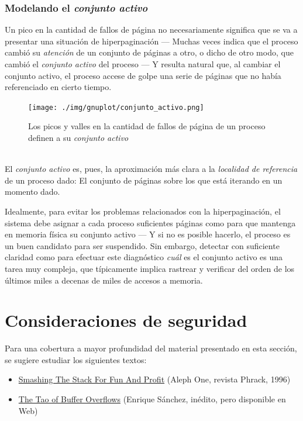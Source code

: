 \documentclass[11pt,fleqn]{book} %
\begin{document}
\subsubsection{Modelando el \emph{conjunto activo}}
\label{sec-5-5-5-1}
\label{MEM_mod_conjunto_activo}


Un pico en la cantidad de fallos de página no necesariamente
significa que se va a presentar una situación de hiperpaginación —
Muchas veces indica que el proceso cambió su \emph{atención} de un
conjunto de páginas a otro, o dicho de otro modo, que cambió el
\emph{conjunto activo} del proceso — Y resulta natural que, al cambiar el
conjunto activo, el proceso accese de golpe una serie de páginas que
no había referenciado en cierto tiempo.
\\
\begin{figure}[h!]
\centering
\texttt{[image: ./img/gnuplot/conjunto\_activo.png]}
\label{MEM_conjunto_activo}
\caption{Los picos y valles en la cantidad de fallos de página de un proceso definen a su \emph{conjunto activo}}
\end{figure}
\\
El \emph{conjunto activo} es, pues, la aproximación más clara a la
\emph{localidad de referencia} de un proceso dado: El conjunto de páginas
sobre los que está iterando en un momento dado.

Idealmente, para evitar los problemas relacionados con la
hiperpaginación, el sistema debe asignar a cada proceso suficientes páginas
como para que mantenga en memoria física su conjunto activo — Y si no
es posible hacerlo, el proceso es un buen candidato para ser
suspendido. Sin embargo, detectar con suficiente claridad como para
efectuar este diagnóstico \emph{cuál} es el conjunto activo es una
tarea muy compleja, que típicamente implica rastrear y verificar del
orden de los últimos miles a decenas de miles de accesos a memoria.
\section{Consideraciones de seguridad}
\label{sec-5-6}


Para una cobertura a mayor profundidad del material presentado en
esta sección, se sugiere estudiar los siguientes textos:

\begin{itemize}
\item \href{http://www.phrack.org/issues.html?issue=49&id=14}{Smashing The Stack For Fun And Profit} (Aleph One, revista
  Phrack, 1996)
\item \href{http://sistop.gwolf.org/biblio/The_Tao_of_Buffer_Overflows_-_Enrique_Sanchez.pdf}{The Tao of Buffer Overflows} (Enrique Sánchez, inédito, pero
  disponible en Web)
\end{itemize}
\end{document}
